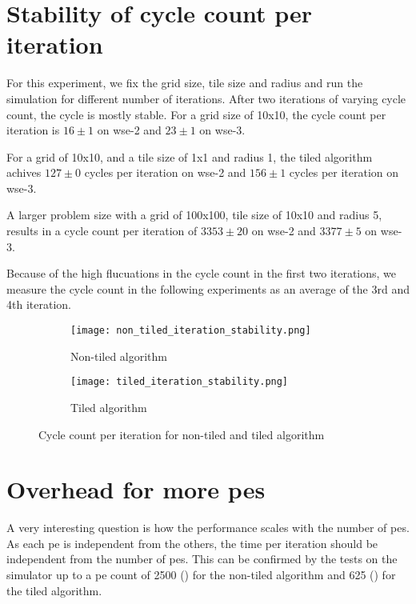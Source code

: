 \section{Stability of cycle count per iteration}
For this experiment, we fix the grid size, tile size and radius and run the simulation for different number of iterations.
After two iterations of varying cycle count, the cycle is mostly stable.
For a grid size of 10x10, the cycle count per iteration is $16\pm1$ on \ac{wse}-2 and $23\pm1$ on \ac{wse}-3.

For a grid of 10x10, and a tile size of 1x1 and radius 1, the tiled algorithm achives $127\pm0$ cycles per iteration on \ac{wse}-2 and $156\pm1$ cycles per iteration on \ac{wse}-3.

A larger problem size with a grid of 100x100, tile size of 10x10 and radius 5, results in a cycle count per iteration of $3353\pm20$ on \ac{wse}-2 and $3377\pm5$ on \ac{wse}-3.

Because of the high flucuations in the cycle count in the first two iterations, we measure the cycle count in the following experiments as an average of the 3rd and 4th iteration.

\begin{figure}[h]
    \centering
    \begin{subfigure}[b]{0.48\textwidth}
        \centering
        \texttt{[image: non\_tiled\_iteration\_stability.png]}
        \caption{Non-tiled algorithm}
        \label{fig:non_tiled_iteration_stability}
    \end{subfigure}
    \hfill
    \begin{subfigure}[b]{0.48\textwidth}
        \centering
        \texttt{[image: tiled\_iteration\_stability.png]}
        \caption{Tiled algorithm}
        \label{fig:tiled_iteration_stability}
    \end{subfigure}
    \caption{Cycle count per iteration for non-tiled and tiled algorithm}
    \label{fig:iteration_stability}
\end{figure}



\section{Overhead for more \acp{pe}}
\label{sec:pe_overhead}
A very interesting question is how the performance scales with the number of \acp{pe}.
As each \ac{pe} is independent from the others, the time per iteration should be independent from the number of \acp{pe}.
This can be confirmed by the tests on the simulator up to a \ac{pe} count of \num{2500} () for the non-tiled algorithm and \num{625} () for the tiled algorithm.

